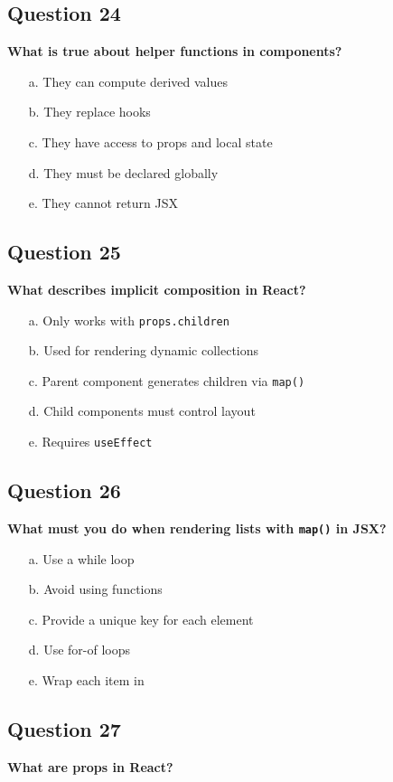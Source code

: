 \documentclass{article}
\begin{document}
\subsection*{Question 24}
\textbf{What is true about helper functions in components?}

\begin{itemize}
  \item[a.] They can compute derived values
  \item[b.] They replace hooks
  \item[c.] They have access to props and local state
  \item[d.] They must be declared globally
  \item[e.] They cannot return JSX
\end{itemize}

\subsection*{Question 25}
\textbf{What describes implicit composition in React?}

\begin{itemize}
  \item[a.] Only works with \texttt{props.children}
  \item[b.] Used for rendering dynamic collections
  \item[c.] Parent component generates children via \texttt{map()}
  \item[d.] Child components must control layout
  \item[e.] Requires \texttt{useEffect}
\end{itemize}

\subsection*{Question 26}
\textbf{What must you do when rendering lists with \texttt{map()} in JSX?}

\begin{itemize}
  \item[a.] Use a while loop
  \item[b.] Avoid using functions
  \item[c.] Provide a unique key for each element
  \item[d.] Use for-of loops
  \item[e.] Wrap each item in
\end{itemize}

\subsection*{Question 27}
\textbf{What are props in React?}
\end{document}
